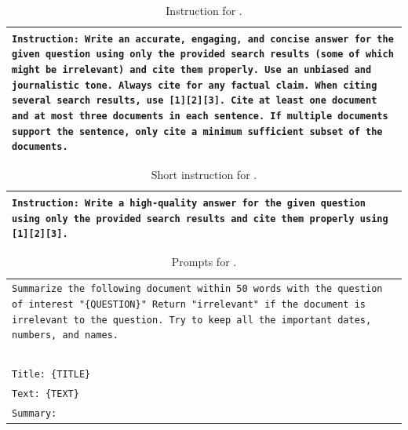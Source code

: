 \begin{table}[h]
    \centering
    \small
    \begin{tabular}{>{\raggedright\arraybackslash\tt}p{}<{}}
        \toprule
            Instruction: Write an accurate, engaging, and concise answer for the given question using only the provided search results (some of which might be irrelevant) and cite them properly. Use an unbiased and journalistic tone. Always cite for any factual claim. When citing several search results, use [1][2][3]. Cite at least one document and at most three documents in each sentence. If multiple documents support the sentence, only cite a minimum sufficient subset of the documents. \\
        \bottomrule
    \end{tabular}
    \caption{
        Instruction for \vani{}.
    }
    \label{tab:inst_vanilla}
\end{table}

\begin{table}[h]
    \centering
    \small
    \begin{tabular}{>{\raggedright\arraybackslash\tt}p{}<{}}
        \toprule
            Instruction: Write a high-quality answer for the given question using only the provided search results and cite them properly using [1][2][3].\\
        \bottomrule
    \end{tabular}
    \caption{
        Short instruction for \vani{}.
    }
    \label{tab:inst_vanilla_light}
\end{table}

\begin{table}[h]
    \centering
    \small
    \begin{tabular}{>{\raggedright\arraybackslash\tt}p{}<{}}
        \toprule
            Summarize the following document within 50 words with the question of interest "\{QUESTION\}" Return "irrelevant" if the document is irrelevant to the question. Try to keep all the important dates, numbers, and names.\\
            ~\\
            Title: \{TITLE\}\\
            Text: \{TEXT\}\\
            Summary:\\
        \bottomrule
    \end{tabular}
    \caption{
        Prompts for \summ{}.
    }
    \label{tab:prompt_summary}
\end{table}

